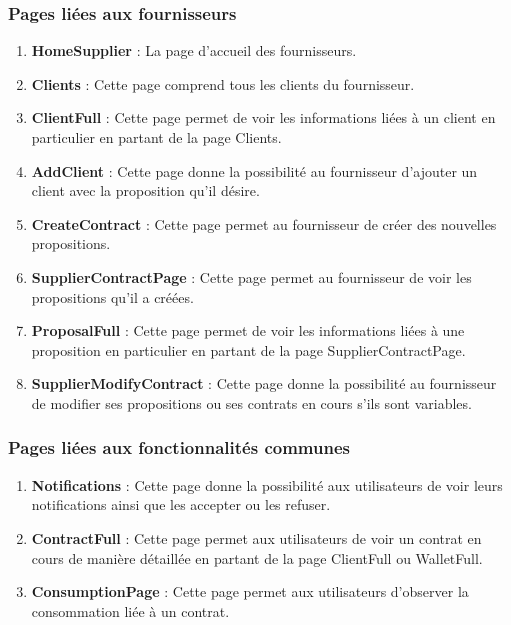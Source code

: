 \subsubsection{Pages liées aux fournisseurs}
\begin{enumerate}
\item \textbf{HomeSupplier} : \newline
La page d’accueil des fournisseurs.
\item \textbf{Clients} : \newline
Cette page comprend tous les clients du fournisseur.
\item \textbf{ClientFull} :  \newline
Cette page permet de voir les informations liées à un client en particulier en partant de la page Clients.
\item \textbf{AddClient} : \newline
Cette page donne la possibilité au fournisseur d’ajouter un client avec la proposition qu’il désire.
\item \textbf{CreateContract} :\newline
Cette page permet au fournisseur de créer des nouvelles propositions.
\item \textbf{SupplierContractPage} :\newline
Cette page permet au fournisseur de voir les propositions qu’il a créées.
\item \textbf{ProposalFull} :\newline
Cette page permet de voir les informations liées à une proposition en particulier en partant de la page SupplierContractPage.
\item \textbf{SupplierModifyContract} :\newline
Cette page donne la possibilité au fournisseur de modifier ses propositions ou ses contrats en cours s’ils sont variables.
\end{enumerate} 

\newpage
\subsubsection{Pages liées aux fonctionnalités communes}
\begin{enumerate}
\item \textbf{Notifications} :\newline
Cette page donne la possibilité aux utilisateurs de voir leurs notifications ainsi que les accepter ou les refuser.
\item \textbf{ContractFull} :\newline
Cette page permet aux utilisateurs de voir un contrat en cours de manière détaillée en partant de la page ClientFull ou WalletFull.
\item \textbf{ConsumptionPage} :\newline
Cette page permet aux utilisateurs d’observer la consommation liée à un contrat.
\end{enumerate} 


